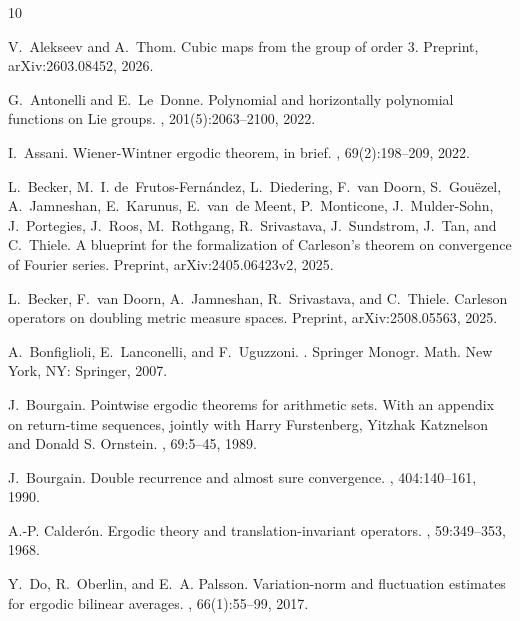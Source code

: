 \documentclass[12pt,reqno,a4paper,dvipsnames]{amsart}
\theoremstyle{plain}
\theoremstyle{definition}
\numberwithin{theorem}{section}
\numberwithin{equation}{section}
\begin{document}
\begin{thebibliography}{10}

V.~Alekseev and A.~Thom.
\newblock Cubic maps from the group of order {$3$}.
\newblock Preprint, {arXiv}:2603.08452, 2026.

G.~Antonelli and E.~Le~Donne.
\newblock Polynomial and horizontally polynomial functions on {Lie} groups.
, 201(5):2063--2100, 2022.

I.~Assani.
\newblock Wiener-{W}intner ergodic theorem, in brief.
, 69(2):198--209, 2022.

L.~Becker, M.~I. de~Frutos-Fernández, L.~Diedering, F.~van Doorn, S.~Gouëzel, A.~Jamneshan, E.~Karunus, E.~van~de Meent, P.~Monticone, J.~Mulder-Sohn, J.~Portegies, J.~Roos, M.~Rothgang, R.~Srivastava, J.~Sundstrom, J.~Tan, and C.~Thiele.
\newblock A blueprint for the formalization of {C}arleson's theorem on convergence of {F}ourier series.
\newblock Preprint, {arXiv}:2405.06423v2, 2025.

L.~Becker, F.~van Doorn, A.~Jamneshan, R.~Srivastava, and C.~Thiele.
\newblock Carleson operators on doubling metric measure spaces.
\newblock Preprint, {arXiv}:2508.05563, 2025.

A.~Bonfiglioli, E.~Lanconelli, and F.~Uguzzoni.
.
\newblock Springer Monogr. Math. New York, NY: Springer, 2007.

J.~Bourgain.
\newblock Pointwise ergodic theorems for arithmetic sets. {With} an appendix on return-time sequences, jointly with {Harry} {Furstenberg}, {Yitzhak} {Katznelson} and {Donald} {S}. {Ornstein}.
, 69:5--45, 1989.

J.~Bourgain.
\newblock Double recurrence and almost sure convergence.
, 404:140--161, 1990.

A.-P. Calder\'{o}n.
\newblock Ergodic theory and translation-invariant operators.
, 59:349--353, 1968.

Y.~Do, R.~Oberlin, and E.~A. Palsson.
\newblock Variation-norm and fluctuation estimates for ergodic bilinear averages.
, 66(1):55--99, 2017.


\end{thebibliography}
\end{document}
